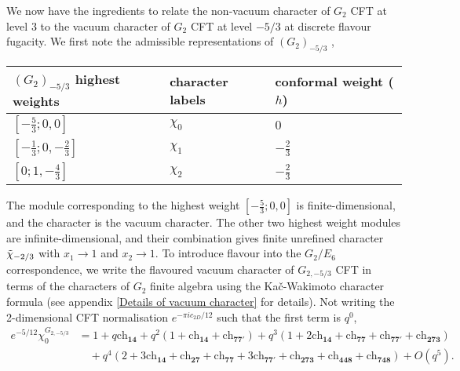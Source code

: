\documentclass[a4paper,12pt]{article}
\begin{document}
We now have the ingredients to relate the non-vacuum character of $G_2$ CFT at level 3 to the vacuum character of $G_2$ CFT at level $-5/3$ at discrete flavour fugacity. We first note the admissible representations of $(G_2)_{-5/3}$ \cite{axtell2010vertex,Kawasetsu:2019att},
%
\begin{table}\label{non-unitary-g2-hw}
\centering
\begin{tabularx}{0.8\textwidth} { 
  | >{\centering\arraybackslash}X 
  | >{\centering\arraybackslash}X 
  | >{\centering\arraybackslash}X | }
 \hline
 $(G_2)_{-5/3}$ highest weights & character labels & conformal weight ($h$) \\
\hline
$[-\frac{5}{3};0,0]$  & $\chi_0$  & $0$ \\
\hline
$[-\frac{1}{3};0,-\frac{2}{3}]$  & $\chi_{1}$  & $-\frac{2}{3}$ \\
\hline
$[0;1,-\frac{4}{3}]$  & $\chi_2$  & $-\frac{2}{3}$ \\
\hline
\end{tabularx}
\end{table} 
%
The module corresponding to the highest weight $[-\frac{5}{3};0,0]$ is finite-dimensional, and the character is the vacuum character. The other two highest weight modules are infinite-dimensional, and their combination gives finite unrefined character $\Tilde{\chi}_{-2/3}$ with $x_1\to 1$ and $x_2\to 1$. To introduce flavour into the $G_2/E_6$ correspondence, we write the flavoured vacuum character of $G_{2,-5/3}$ CFT in terms of the characters of $G_2$ finite algebra using the Ka\v c-Wakimoto character formula (see appendix \ref{Details of vacuum character} for details). Not writing the 2-dimensional CFT normalisation $e^{-\pi i c_{2D}/12}$ such that the first term is $q^0$,
%
\begin{align}\label{g2-frac-vacuum}
    e^{-5/12}\chi_{0}^{G_{2,-5/3}}&= 1+q\mathrm{ch}_{\mathbf{14}}+q^2(1+\mathrm{ch}_{\mathbf{14}}+\mathrm{ch}_{\mathbf{77'}})+q^3(1+2\mathrm{ch}_{\mathbf{14}}+\mathrm{ch}_{\mathbf{77}}+\mathrm{ch}_{\mathbf{77'}}+\mathrm{ch}_{\mathbf{273}})\nonumber\\
&\quad+q^4(2+3\mathrm{ch}_{\mathbf{14}}+\mathrm{ch}_{\mathbf{27}}+\mathrm{ch}_{\mathbf{77}}+3\mathrm{ch}_{\mathbf{77'}}+\mathrm{ch}_{\mathbf{273}}+\mathrm{ch}_{\mathbf{448}}+\mathrm{ch}_{\mathbf{748}})+\textit{O}(q^5).
\end{align}
%
\end{document}
